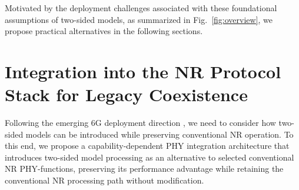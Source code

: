 \documentclass[10pt,twocolumn]{IEEEtran}
\begin{document}







\vspace{1mm}
Motivated by the deployment challenges associated with these foundational assumptions of two-sided models, as summarized in Fig.~\ref{fig:overview}, we propose practical alternatives in the following sections.




\section{Integration into the NR Protocol Stack for Legacy Coexistence}
Following the emerging 6G deployment direction \cite{ngmn2026architecture}, we need to consider how two-sided models can be introduced while preserving conventional NR operation. To this end, we propose a capability-dependent PHY integration architecture that introduces two-sided model processing as an alternative to selected conventional NR PHY-functions, preserving its performance advantage while retaining the conventional NR processing path without modification.
\end{document}
